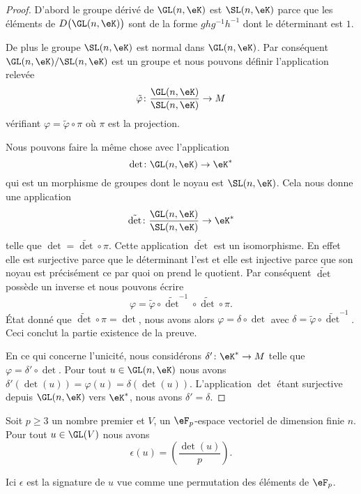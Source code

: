\begin{proof}
    D'abord le groupe dérivé de \( \GL(n,\eK)\) est \( \SL(n,\eK)\) parce que les éléments de \( D\big( \GL(n,\eK) \big)\) sont de la forme \( ghg^{-1}h^{-1}\) dont le déterminant est \( 1\).
    
    De plus le groupe \( \SL(n,\eK)\) est normal dans \( \GL(n,\eK)\). Par conséquent \( \GL(n,\eK)/\SL(n,\eK)\) est un groupe et nous pouvons définir l'application relevée
    \begin{equation}
        \tilde \varphi\colon \frac{ \GL(n,\eK) }{ \SL(n,\eK) }\to M
    \end{equation}
    vérifiant \( \varphi=\tilde \varphi\circ\pi\) où \( \pi\) est la projection. 

    Nous pouvons faire la même chose avec l'application
    \begin{equation}
        \det\colon \GL(n,\eK)\to \eK^*
    \end{equation}
    qui est un morphisme de groupes dont le noyau est \( \SL(n,\eK)\). Cela nous donne une application
    \begin{equation}
        \tilde \det\colon \frac{ \GL(n,\eK) }{ \SL(n,\eK) }\to \eK^*
    \end{equation}
    telle que \( \det=\tilde \det\circ\pi\). Cette application \( \tilde \det\) est un isomorphisme. En effet elle est surjective parce que le déterminant l'est et elle est injective parce que son noyau est précisément ce par quoi on prend le quotient. Par conséquent \( \tilde \det \) possède un inverse et nous pouvons écrire
    \begin{equation}
        \varphi=\tilde \varphi\circ\tilde \det^{-1}\circ\tilde \det\circ\pi.
    \end{equation}
    État donné que \( \tilde \det\circ\pi=\det\), nous avons alors \( \varphi=\delta\circ\det\) avec \( \delta=\tilde \varphi\circ\tilde \det^{-1}\). Ceci conclut la partie existence de la preuve.

    En ce qui concerne l'unicité, nous considérons \( \delta'\colon \eK^*\to M\) telle que \( \varphi=\delta'\circ\det\). Pour tout \( u\in \GL(n,\eK)\) nous avons \( \delta'(\det(u))=\varphi(u)=\delta(\det(u))\). L'application \( \det\) étant surjective depuis \( \GL(n,\eK)\) vers \( \eK^*\), nous avons \( \delta'=\delta\).
\end{proof}

\begin{theorem}
    Soit \( p\geq 3\) un nombre premier et \( V\), un \( \eF_p\)-espace vectoriel de dimension finie \( n\). Pour tout \( u\in\GL(V)\) nous avons
    \begin{equation}
        \epsilon(u)=\left(\frac{\det(u)}{p}\right).
    \end{equation}
\end{theorem}
Ici \( \epsilon\) est la signature de \( u \) vue comme une permutation des éléments de \( \eF_p\).

